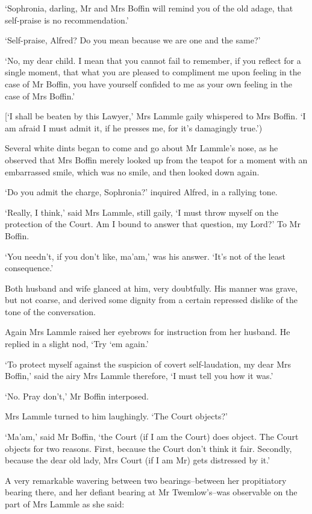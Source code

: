 ‘Sophronia, darling, Mr and Mrs Boffin will remind you of the old adage,
that self-praise is no recommendation.’

‘Self-praise, Alfred? Do you mean because we are one and the same?’

‘No, my dear child. I mean that you cannot fail to remember, if you
reflect for a single moment, that what you are pleased to compliment me
upon feeling in the case of Mr Boffin, you have yourself confided to me
as your own feeling in the case of Mrs Boffin.’

[‘I shall be beaten by this Lawyer,’ Mrs Lammle gaily whispered to
Mrs Boffin. ‘I am afraid I must admit it, if he presses me, for it’s
damagingly true.’)

Several white dints began to come and go about Mr Lammle’s nose, as he
observed that Mrs Boffin merely looked up from the teapot for a moment
with an embarrassed smile, which was no smile, and then looked down
again.

‘Do you admit the charge, Sophronia?’ inquired Alfred, in a rallying
tone.

‘Really, I think,’ said Mrs Lammle, still gaily, ‘I must throw myself
on the protection of the Court. Am I bound to answer that question, my
Lord?’ To Mr Boffin.

‘You needn’t, if you don’t like, ma’am,’ was his answer. ‘It’s not of
the least consequence.’

Both husband and wife glanced at him, very doubtfully. His manner was
grave, but not coarse, and derived some dignity from a certain repressed
dislike of the tone of the conversation.

Again Mrs Lammle raised her eyebrows for instruction from her husband.
He replied in a slight nod, ‘Try ‘em again.’

‘To protect myself against the suspicion of covert self-laudation, my
dear Mrs Boffin,’ said the airy Mrs Lammle therefore, ‘I must tell you
how it was.’

‘No. Pray don’t,’ Mr Boffin interposed.

Mrs Lammle turned to him laughingly. ‘The Court objects?’

‘Ma’am,’ said Mr Boffin, ‘the Court (if I am the Court) does object. The
Court objects for two reasons. First, because the Court don’t think it
fair. Secondly, because the dear old lady, Mrs Court (if I am Mr) gets
distressed by it.’

A very remarkable wavering between two bearings--between her
propitiatory bearing there, and her defiant bearing at Mr Twemlow’s--was
observable on the part of Mrs Lammle as she said:

